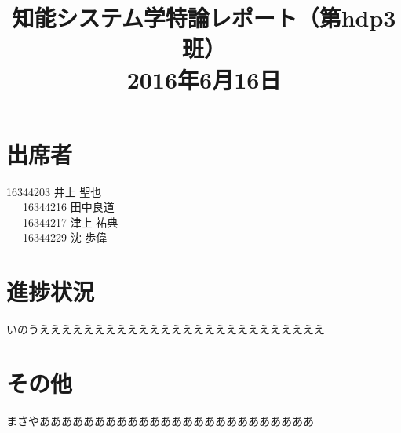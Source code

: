 \documentclass[a4paper,12pt]{jarticle}
\begin{document}
%
\title{\vspace{-30mm}知能システム学特論レポート（第hdp3班）\\ 2016年6月16日}
\date{}
%
%
\maketitle
%
\vspace{-30mm}
%
\section{出席者}
16344203 井上 聖也\\
~~~16344216 田中良道\\
~~~16344217 津上 祐典\\
~~~16344229 沈 歩偉
\section{進捗状況}
いのうええええええええええええええええええええええええええ
\section{その他}
まさやあああああああああああああああああああああああああ
\end{document}
